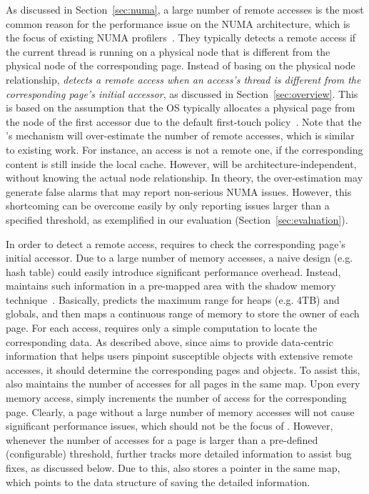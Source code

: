 As discussed in Section~\ref{sec:numa},  a large number of remote accesses is the most common reason for the performance issue on the NUMA architecture, which is the focus of existing NUMA profilers~\cite{XuNuma, valat:2018:numaprof}. They typically detects a remote access if the current thread is running on a physical node that is different from the physical node of the corresponding page. Instead of basing on the physical node relationship, \textit{\NP{} detects a remote access when an access's thread is different from the corresponding page's initial accessor}, as discussed in Section~\ref{sec:overview}. This is based on the assumption that the OS typically allocates a physical page from the node of the first accessor due to the default first-touch policy~\cite{firsttouch}.  Note that the \NP{}'s mechanism will over-estimate the number of remote accesses, which is similar to existing work. For instance, an access is not a remote one, if the corresponding content is still inside the local cache. However, \NP{} will be architecture-independent, without knowing the actual node relationship.  In theory, the over-estimation may generate false alarms that may report non-serious NUMA issues.  However, this shortcoming can be overcome easily by only reporting issues larger than a specified threshold, as exemplified in our evaluation (Section~\ref{sec:evaluation}).  

In order to detect a remote access, \NP{} requires to check the corresponding page's initial accessor. Due to a large number of memory accesses, a naive design (e.g. hash table) could easily introduce significant performance overhead. Instead, \NP{} maintains such information in a pre-mapped area with the shadow memory technique~\cite{qinzhao}. Basically, \NP{} predicts the maximum range for heaps (e.g. 4TB) and globals, and then maps a continuous range of memory to store the owner of each page. For each access, \NP{} requires only a simple computation to locate the corresponding data. As described above, since \NP{} aims to provide data-centric information that helps users pinpoint susceptible objects with extensive remote accesses, it should determine the corresponding pages and objects. To assist this, \NP{} also maintains the number of accesses for all pages in the same map. Upon every memory access, \NP{} simply increments the number of access for the corresponding page. Clearly, a page without a large number of memory accesses will not cause significant performance issues, which should not be the focus of \NP{}. However, whenever the number of accesses for a page is larger than a pre-defined (configurable) threshold, \NP{} further tracks more detailed information to assist bug fixes, as discussed below. Due to this, \NP{} also stores a pointer in the same map, which points to the data structure of saving the detailed information.   

